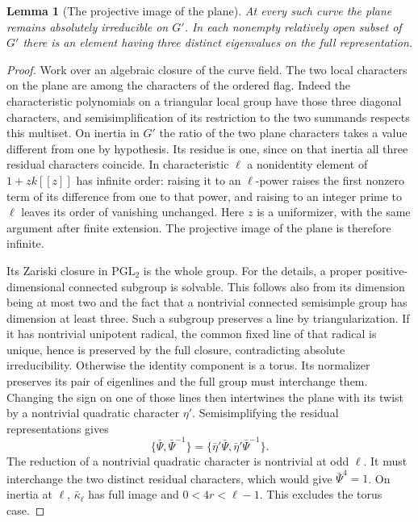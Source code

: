 \documentclass[a4paper,11pt]{article}
\newtheorem{lemma}[proposition]{Lemma}
\theoremstyle{definition}
\theoremstyle{remark}
\numberwithin{equation}{section}
\begin{document}
\begin{lemma}[The projective image of the plane]\leavevmode
\label{lem:planecurve417}
At every such curve the plane remains absolutely irreducible
on \(G'\). In each nonempty relatively open subset of \(G'\)
there is an element having three distinct eigenvalues on the
full representation.
\end{lemma}
\begin{proof}
Work over an algebraic closure of the curve field. The two
local characters on the plane are among the characters of the
ordered flag. Indeed the characteristic polynomials on a
triangular local group have those three diagonal characters,
and semisimplification of its restriction to the two summands
respects this multiset. On inertia in \(G'\) the ratio of the
two plane characters takes a value different from one by
hypothesis. Its residue is one, since on that inertia all
three residual characters coincide. In characteristic \(\ell\)
a nonidentity element of \(1+z k[[z]]\) has infinite order:
raising it to an \(\ell\)-power raises the first nonzero term
of its difference from one to that power, and raising to an
integer prime to \(\ell\) leaves its order of vanishing unchanged.
Here \(z\) is a uniformizer, with the same argument after
finite extension. The projective image of the plane is
therefore infinite.

Its Zariski closure in \(\mathrm{PGL}_2\) is the whole group.
For the details, a proper positive-dimensional connected
subgroup is solvable. This follows also from its dimension
being at most two and the fact that a nontrivial connected
semisimple group has dimension at least three. Such a subgroup
preserves a line by triangularization. If it has nontrivial
unipotent radical, the common fixed line of that radical is
unique, hence is preserved by the full closure, contradicting
absolute irreducibility. Otherwise the identity component is a
torus. Its normalizer preserves its pair of eigenlines and
the full group must interchange them. Changing the sign on one
of those lines then intertwines the plane with its twist by a
nontrivial quadratic character \(\eta'\). Semisimplifying the
residual representations gives
\[
 \{\bar\Psi,\bar\Psi^{-1}\}
       =\{\bar\eta'\bar\Psi,\bar\eta'\bar\Psi^{-1}\}.
\]
The reduction of a nontrivial quadratic character is nontrivial
at odd \(\ell\). It must interchange the two distinct residual
characters, which would give \(\bar\Psi^4=1\). On inertia at
\(\ell\), \(\bar\kappa_\ell\) has full image and \(0<4r<\ell-1\).
This excludes the torus case.


\end{proof}
\end{document}
